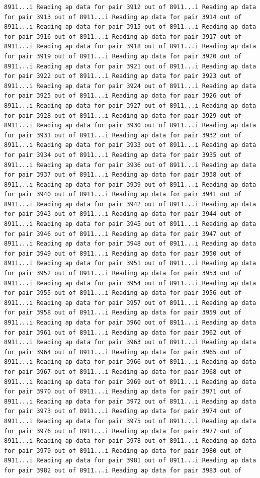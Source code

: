 \documentclass[
]{article}
\begin{document}
\begin{verbatim}
8911...i Reading ap data for pair 3912 out of 8911...i Reading ap data for pair 3913 out of 8911...i Reading ap data for pair 3914 out of 8911...i Reading ap data for pair 3915 out of 8911...i Reading ap data for pair 3916 out of 8911...i Reading ap data for pair 3917 out of 8911...i Reading ap data for pair 3918 out of 8911...i Reading ap data for pair 3919 out of 8911...i Reading ap data for pair 3920 out of 8911...i Reading ap data for pair 3921 out of 8911...i Reading ap data for pair 3922 out of 8911...i Reading ap data for pair 3923 out of 8911...i Reading ap data for pair 3924 out of 8911...i Reading ap data for pair 3925 out of 8911...i Reading ap data for pair 3926 out of 8911...i Reading ap data for pair 3927 out of 8911...i Reading ap data for pair 3928 out of 8911...i Reading ap data for pair 3929 out of 8911...i Reading ap data for pair 3930 out of 8911...i Reading ap data for pair 3931 out of 8911...i Reading ap data for pair 3932 out of 8911...i Reading ap data for pair 3933 out of 8911...i Reading ap data for pair 3934 out of 8911...i Reading ap data for pair 3935 out of 8911...i Reading ap data for pair 3936 out of 8911...i Reading ap data for pair 3937 out of 8911...i Reading ap data for pair 3938 out of 8911...i Reading ap data for pair 3939 out of 8911...i Reading ap data for pair 3940 out of 8911...i Reading ap data for pair 3941 out of 8911...i Reading ap data for pair 3942 out of 8911...i Reading ap data for pair 3943 out of 8911...i Reading ap data for pair 3944 out of 8911...i Reading ap data for pair 3945 out of 8911...i Reading ap data for pair 3946 out of 8911...i Reading ap data for pair 3947 out of 8911...i Reading ap data for pair 3948 out of 8911...i Reading ap data for pair 3949 out of 8911...i Reading ap data for pair 3950 out of 8911...i Reading ap data for pair 3951 out of 8911...i Reading ap data for pair 3952 out of 8911...i Reading ap data for pair 3953 out of 8911...i Reading ap data for pair 3954 out of 8911...i Reading ap data for pair 3955 out of 8911...i Reading ap data for pair 3956 out of 8911...i Reading ap data for pair 3957 out of 8911...i Reading ap data for pair 3958 out of 8911...i Reading ap data for pair 3959 out of 8911...i Reading ap data for pair 3960 out of 8911...i Reading ap data for pair 3961 out of 8911...i Reading ap data for pair 3962 out of 8911...i Reading ap data for pair 3963 out of 8911...i Reading ap data for pair 3964 out of 8911...i Reading ap data for pair 3965 out of 8911...i Reading ap data for pair 3966 out of 8911...i Reading ap data for pair 3967 out of 8911...i Reading ap data for pair 3968 out of 8911...i Reading ap data for pair 3969 out of 8911...i Reading ap data for pair 3970 out of 8911...i Reading ap data for pair 3971 out of 8911...i Reading ap data for pair 3972 out of 8911...i Reading ap data for pair 3973 out of 8911...i Reading ap data for pair 3974 out of 8911...i Reading ap data for pair 3975 out of 8911...i Reading ap data for pair 3976 out of 8911...i Reading ap data for pair 3977 out of 8911...i Reading ap data for pair 3978 out of 8911...i Reading ap data for pair 3979 out of 8911...i Reading ap data for pair 3980 out of 8911...i Reading ap data for pair 3981 out of 8911...i Reading ap data for pair 3982 out of 8911...i Reading ap data for pair 3983 out of 
\end{verbatim}
\end{document}
